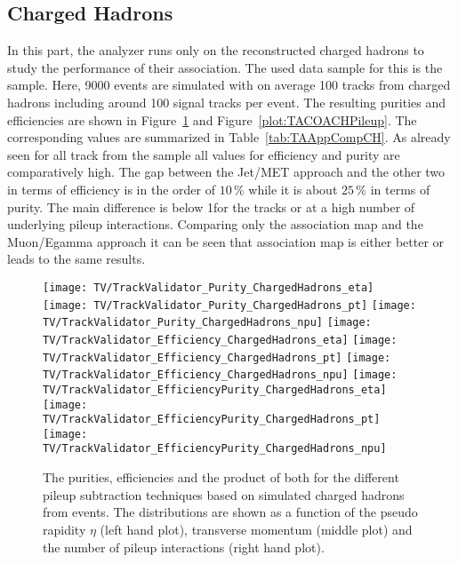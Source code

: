


\subsection{Charged Hadrons \label{sec:TASEFRDACH}}

In this part, the analyzer runs only on the reconstructed charged hadrons to study the performance of their association. The used data sample for this is the \ttbar sample. Here, 9000 events are simulated with on average 100 tracks from charged hadrons including around 100 signal tracks per event. The resulting purities and efficiencies are shown in Figure~\ref{plot:TACOACHSignal} and Figure~\ref{plot:TACOACHPileup}. The corresponding values are summarized in Table~\ref{tab:TAAppCompCH}. As already seen for all track from the \ttbar sample all values for efficiency and purity are comparatively high. The gap between the Jet/MET approach and the other two in terms of efficiency is in the order of $10\,\%$ while it is about $25\,\%$ in terms of purity. The main difference is below 1\GeV for the tracks \pt or at a high number of underlying pileup interactions. Comparing only the association map and the Muon/Egamma approach it can be seen that association map is either better or leads to the same results.

\begin{figure}[h!t]
  \centering
  \texttt{[image: TV/TrackValidator\_Purity\_ChargedHadrons\_eta]}
  \texttt{[image: TV/TrackValidator\_Purity\_ChargedHadrons\_pt]}
  \texttt{[image: TV/TrackValidator\_Purity\_ChargedHadrons\_npu]}
  \newline
  \texttt{[image: TV/TrackValidator\_Efficiency\_ChargedHadrons\_eta]}
  \texttt{[image: TV/TrackValidator\_Efficiency\_ChargedHadrons\_pt]}
  \texttt{[image: TV/TrackValidator\_Efficiency\_ChargedHadrons\_npu]}
  \newline
  \texttt{[image: TV/TrackValidator\_EfficiencyPurity\_ChargedHadrons\_eta]}
  \texttt{[image: TV/TrackValidator\_EfficiencyPurity\_ChargedHadrons\_pt]}
  \texttt{[image: TV/TrackValidator\_EfficiencyPurity\_ChargedHadrons\_npu]}
  \caption[Purity, efficiency and their product for the different pileup subtraction techniques based on simulated charged hadrons from \ttbar events]{The purities, efficiencies and the product of both for the different pileup subtraction techniques based on simulated charged hadrons from \ttbar events. The distributions are shown as a function of the pseudo rapidity $\eta$ (left hand plot), transverse momentum (middle plot) and the number of pileup interactions (right hand plot). \label{plot:TACOACHSignal}}
\end{figure}

